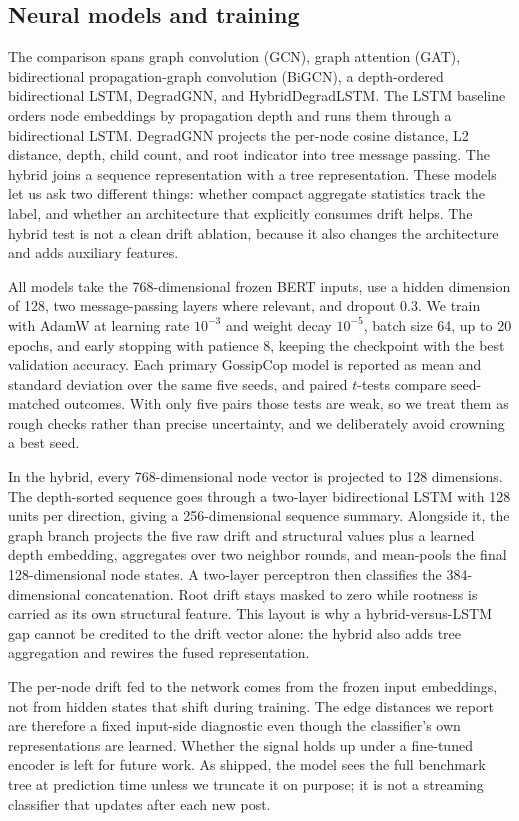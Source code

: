 \documentclass[conference]{IEEEtran}
\begin{document}
\subsection{Neural models and training}
The comparison spans graph convolution (GCN), graph attention (GAT),
bidirectional propagation-graph convolution (BiGCN), a depth-ordered
bidirectional LSTM, DegradGNN, and HybridDegradLSTM. The LSTM baseline orders
node embeddings by propagation depth and runs them through a bidirectional
LSTM. DegradGNN projects the per-node cosine distance, L2 distance, depth,
child count, and root indicator into tree message passing. The hybrid joins a
sequence representation with a tree representation. These models let us ask two
different things: whether compact aggregate statistics track the label, and
whether an architecture that explicitly consumes drift helps. The hybrid test
is not a clean drift ablation, because it also changes the architecture and
adds auxiliary features.

All models take the 768-dimensional frozen BERT inputs, use a hidden dimension
of 128, two message-passing layers where relevant, and dropout 0.3. We train
with AdamW at learning rate $10^{-3}$ and weight decay $10^{-5}$, batch size
64, up to 20 epochs, and early stopping with patience 8, keeping the
checkpoint with the best validation accuracy. Each primary GossipCop model is
reported as mean and standard deviation over the same five seeds, and paired
$t$-tests compare seed-matched outcomes. With only five pairs those tests are
weak, so we treat them as rough checks rather than precise uncertainty, and we
deliberately avoid crowning a best seed.

In the hybrid, every 768-dimensional node vector is projected to 128 dimensions.
The depth-sorted sequence goes through a two-layer bidirectional LSTM with 128
units per direction, giving a 256-dimensional sequence summary. Alongside it,
the graph branch projects the five raw drift and structural values plus a
learned depth embedding, aggregates over two neighbor rounds, and mean-pools
the final 128-dimensional node states. A two-layer perceptron then classifies
the 384-dimensional concatenation. Root drift stays masked to zero while
rootness is carried as its own structural feature. This layout is why a
hybrid-versus-LSTM gap cannot be credited to the drift vector alone: the hybrid
also adds tree aggregation and rewires the fused representation.

The per-node drift fed to the network comes from the frozen input embeddings,
not from hidden states that shift during training. The edge distances we report
are therefore a fixed input-side diagnostic even though the classifier's own
representations are learned. Whether the signal holds up under a fine-tuned
encoder is left for future work. As shipped, the model sees the full benchmark
tree at prediction time unless we truncate it on purpose; it is not a streaming
classifier that updates after each new post.
\end{document}
